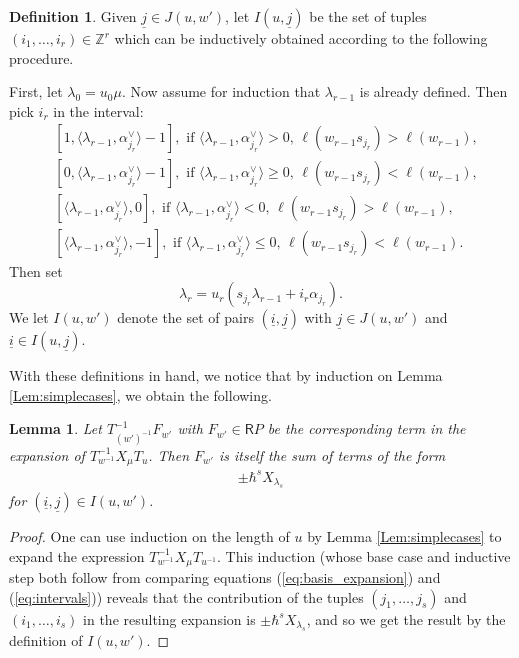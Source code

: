 \documentclass{amsart}
\newcommand{\Z}{\mathbb{Z}}
\newcommand{\Ring}{\mathsf{R}}
\newtheorem{Lem}[Thm]{Lemma}
\theoremstyle{definition}
\newtheorem{defi}[Thm]{Definition}
\numberwithin{equation}{section}
\begin{document}
\begin{defi}
    Given $\underline{j} \in J(u, w')$, let $I(u, \underline{j})$ be the set of tuples  $(i_1,\ldots,i_r)\in \Z^r$ which can be inductively obtained according to the following procedure.

    First, let $\lambda_0 = u_0\mu$. Now assume for induction that $\lambda_{r-1}$ is already defined. Then pick $i_r$ in the interval:
    \begin{equation}\label{eq:intervals}
\begin{split}
&
{[1,\langle \lambda_{r-1}, \alpha_{j_r}^\vee\rangle-1]}, \text{ if } \langle \lambda_{r-1}, \alpha_{j_r}^\vee\rangle> 0,\, \ell(w_{r-1}s_{j_r})>\ell(w_{r-1}),\\
& {[0,\langle \lambda_{r-1}, \alpha_{j_r}^\vee\rangle-1]}, \text{ if } \langle \lambda_{r-1}, \alpha_{j_r}^\vee\rangle\geqslant  0, \,\ell(w_{r-1}s_{j_r})<\ell(w_{r-1}),\\
&{[\langle\lambda_{r-1},\alpha_{j_r}^\vee\rangle,0]}, \text{ if }
\langle \lambda_{r-1}, \alpha_{j_r}^\vee\rangle< 0,\, \ell(w_{r-1}s_{j_r})>\ell(w_{r-1}),\\
&{[\langle\lambda_{r-1},\alpha_{j_r}^\vee\rangle,-1]}, \text{ if }
\langle \lambda_{r-1}, \alpha_{j_r}^\vee\rangle\leqslant 0,\, \ell(w_{r-1}s_{j_r})<\ell(w_{r-1}).
\end{split}
\end{equation}
Then set \begin{equation}\label{eq:lambda_r_formula}
\lambda_r=u_r(s_{j_r}\lambda_{r-1}{+}i_r\alpha_{j_r}).
\end{equation}
We let $I(u, w')$ denote the set of pairs $(\underline{i}, \underline{j})$ with $\underline{j} \in J(u, w')$ and $\underline{i} \in I(u, \underline{j})$.
\end{defi}
With these definitions in hand, we notice that by induction on Lemma \ref{Lem:simplecases}, we obtain the following.

\begin{Lem}\label{Lem:contributions}
    Let $T_{(w')^{-1}}^{-1}F_{w'}$ with $F_{w'} \in \Ring P$ be the corresponding term in the expansion of $T_{w^{-1}}^{-1} X_\mu T_u$. Then $F_{w'}$ is itself the sum of terms of the form
    \begin{align}
        \pm \hbar^s X_{\lambda_s}
    \end{align}
    for $(\underline{i}, \underline{j}) \in I(u, w')$.
\end{Lem}
\begin{proof}
    One can use induction on the length of $u$ by Lemma \ref{Lem:simplecases} to expand the expression $T_{w^{-1}}^{-1} X_\mu T_{u^{-1}}$. This induction (whose base case and inductive step both follow from comparing equations (\ref{eq:basis_expansion}) and (\ref{eq:intervals})) reveals that the contribution of the tuples $(j_1, \dots, j_s)$ and $(i_1, \dots, i_s)$ in the resulting expansion is $\pm \hbar^s X_{\lambda_s}$, and so we get the result by the definition of $I(u, w')$.
\end{proof}
\end{document}
